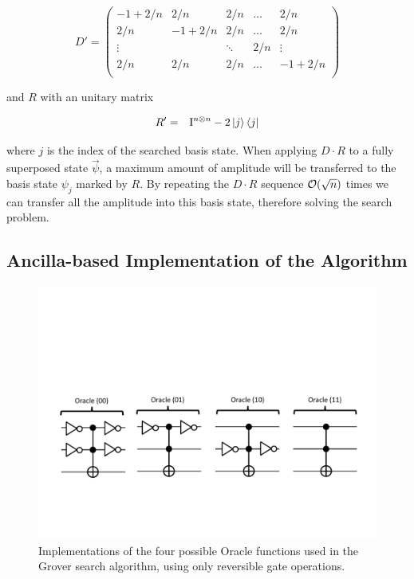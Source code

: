 \begin{equation}
D' = \left( \begin{array}{ccccc}
	-1+2/n & 2/n & 2/n & \hdots & 2/n \\
	2/n & -1 + 2/n & 2/n & \hdots & 2/n \\
	\vdots & & \ddots & 2/n & \vdots \\
	2/n & 2/n & 2/n & \hdots & -1 + 2/n \\ 
	\end{array} \right) \label{eq:GroverDiffusionOperator}
\end{equation}

and $R$ with an unitary matrix 

\begin{eqnarray}
R' & = & \mathrm{I}^{n\otimes n}-2\left| j \right>\left< j \right| \label{eq:GroverOracleFunction}
\end{eqnarray}

where $j$ is the index of the searched basis state. When applying $D\cdot R$ to a fully superposed state $\vec{\psi}$, a maximum amount of amplitude will be transferred to the basis state $\psi_j$ marked by $R$. By repeating the $D\cdot R$ sequence $\begin{mathcal}O\end{mathcal}(\sqrt{n})$ times we can transfer all the amplitude into this basis state, therefore solving the search problem.

\subsection{Ancilla-based Implementation of the Algorithm}

\begin{figure}[ht!]
	\centering
		\includegraphics[width=1\textwidth]{./material/papers/grover/different_oracle_implementations}
	\caption[Implementations of the four possible Oracle functions used in the Grover search algorithm, using only reversible gate operations]{Implementations of the four possible Oracle functions used in the Grover search algorithm, using only reversible gate operations.}
	\label{fig:GroverOracleImplementations}
\end{figure}

